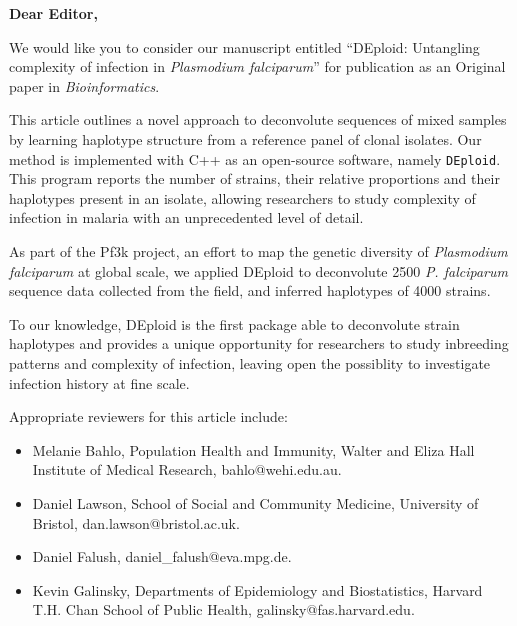 \documentclass{letter}
\begin{document}

\begin{letter}{ } %


\opening{\textbf{Dear Editor,}}

We would like you to consider our manuscript entitled ``DEploid: Untangling complexity of infection in {\it Plasmodium falciparum}'' for publication as an Original paper in {\em Bioinformatics}.

This article outlines a novel approach to deconvolute sequences of mixed samples by learning haplotype structure from a reference panel of clonal isolates. Our method is implemented with C++ as an open-source software, namely {\tt DEploid}. This program reports the number of strains, their relative proportions and their haplotypes present in an isolate, allowing researchers to study complexity of infection in malaria
with an unprecedented level of detail.

As part of the Pf3k project, an effort to map the genetic diversity of {\it Plasmodium falciparum} at global scale, we applied DEploid to deconvolute 2500 {\em P. falciparum} sequence data collected from the field, and inferred haplotypes of 4000 strains.

To our knowledge, DEploid is the first package able to deconvolute strain haplotypes and provides a unique opportunity for researchers to study inbreeding patterns and complexity of infection, leaving open the possiblity to investigate infection history at fine scale.

Appropriate reviewers for this article include:
\begin{itemize}
\item Melanie Bahlo, Population Health and Immunity, Walter and Eliza Hall Institute of Medical Research, bahlo@wehi.edu.au.
\item Daniel Lawson, School of Social and Community Medicine, University of Bristol, dan.lawson@bristol.ac.uk.
\item Daniel Falush, daniel\_falush@eva.mpg.de.
\item Kevin Galinsky, Departments of Epidemiology and Biostatistics, Harvard T.H. Chan School of Public Health, galinsky@fas.harvard.edu.
\end{itemize}



\end{letter}
\end{document}
